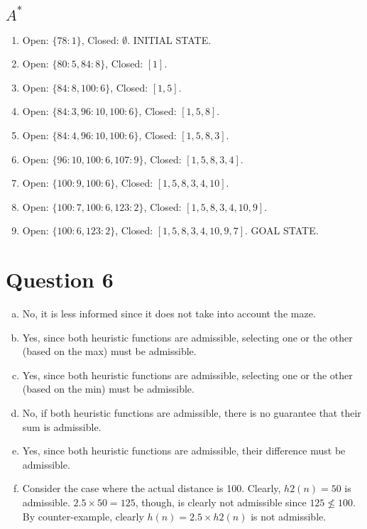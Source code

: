 \documentclass[12pt]{article}
\begin{document}
\subsection*{$A^*$}
\begin{enumerate}
\item Open: $\{78: 1\}$, Closed: $\emptyset$. INITIAL STATE.
\item Open: $\{80: 5, 84: 8\}$, Closed: $[1]$.
\item Open: $\{84: 8, 100: 6\}$, Closed: $[1, 5]$.
\item Open: $\{84: 3, 96: 10, 100: 6\}$, Closed: $[1, 5, 8]$.
\item Open: $\{84: 4, 96: 10, 100: 6\}$, Closed: $[1, 5, 8, 3]$.
\item Open: $\{96: 10, 100: 6, 107: 9\}$, Closed: $[1, 5, 8, 3, 4]$.
\item Open: $\{100: 9, 100: 6\}$, Closed: $[1, 5, 8, 3, 4, 10]$.
\item Open: $\{100: 7, 100: 6, 123: 2\}$, Closed: $[1, 5, 8, 3, 4, 10, 9]$.
\item Open: $\{100: 6, 123: 2\}$, Closed: $[1, 5, 8, 3, 4, 10, 9, 7]$. GOAL STATE.
\end{enumerate}

\section*{Question 6}
\begin{enumerate}[a.]
\item No, it is less informed since it does not take into account the maze.
\item Yes, since both heuristic functions are admissible, selecting one or the other (based on the max) must be admissible.
\item Yes, since both heuristic functions are admissible, selecting one or the other (based on the min) must be admissible.
\item No, if both heuristic functions are admissible, there is no guarantee that their sum is admissible.
\item Yes, since both heuristic functions are admissible, their difference must be admissible.
\item Consider the case where the actual distance is 100. Clearly, $h2(n) = 50$ is admissible. $2.5 \times 50 = 125$, though, is clearly not admissible since $125 \not\leq 100$. By counter-example, clearly $h(n) = 2.5 \times h2(n)$ is not admissible.
\end{enumerate}
\end{document}
